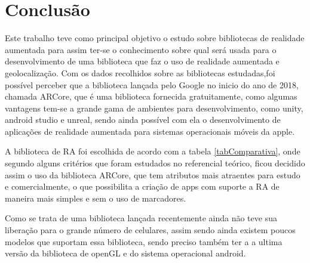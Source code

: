 \chapter{Conclusão}\label{cap:conclusao}
Este trabalho teve como principal objetivo o estudo sobre bibliotecas de realidade aumentada para assim ter-se o conhecimento sobre qual será usada para o desenvolvimento de uma biblioteca que faz o uso de realidade aumentada e geolocalização. Com os dados recolhidos sobre as bibliotecas estudadas,foi possível perceber que a biblioteca lançada pelo Google no inicio do ano de 2018, chamada ARCore, que é uma biblioteca fornecida gratuitamente, como algumas vantagens tem-se a grande gama de ambientes para desenvolvimento, como unity, android studio e unreal, sendo ainda possível com ela o desenvolvimento de aplicações de realidade aumentada para sistemas operacionais móveis da apple.

A biblioteca de RA foi escolhida de acordo com a tabela \ref{tabComparativa}, onde segundo alguns critérios que foram estudados no referencial teórico, ficou decidido assim o uso da biblioteca ARCore, que tem atributos mais atraentes para estudo e comercialmente, o que possibilita a criação de apps com suporte a RA de maneira mais simples e sem o uso de marcadores.

Como se trata de uma biblioteca lançada recentemente ainda não teve sua liberação para o grande número de celulares, assim sendo ainda existem poucos modelos que suportam essa biblioteca, sendo preciso também ter a a ultima versão da biblioteca de openGL e do sistema operacional android. 